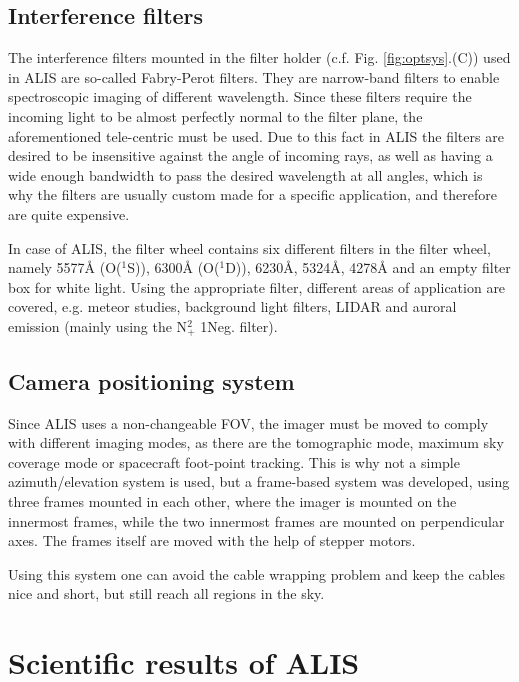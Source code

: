 \subsection{Interference filters}
The interference filters mounted in the filter holder (c.f. Fig. \ref{fig:optsys}.(C)) used in ALIS are so-called Fabry-Perot filters. They are narrow-band filters to enable spectroscopic imaging of different wavelength. Since these filters require the incoming light to be almost perfectly normal to the filter plane, the aforementioned tele-centric must be used.
Due to this fact in ALIS the filters are desired to be insensitive against the angle of incoming rays, as well as having a wide enough bandwidth to pass the desired wavelength at all angles, which is why the filters are usually custom made for a specific application, and therefore are quite expensive. \par
In case of ALIS, the filter wheel contains six different filters in the filter wheel, namely 5577Å (O($^1$S)), 6300Å (O($^1$D)), 6230Å, 5324Å, 4278Å and an empty filter box for white light. Using the appropriate filter, different areas of application are covered, e.g. meteor studies, background light filters, LIDAR and auroral emission (mainly using the N$^2_+$ 1Neg. filter)\citep{brandstrom2003auroral}.

\subsection{Camera positioning system}
Since ALIS uses a non-changeable FOV, the imager must be moved to comply with different imaging modes, as there are the tomographic mode, maximum sky coverage mode or spacecraft foot-point tracking. This is why not a simple azimuth/elevation system is used, but a frame-based system was developed, using three frames mounted in each other, where the imager is mounted on the innermost frames, while the two innermost frames are mounted on perpendicular axes. The frames itself are moved with the help of stepper motors.

Using this system one can avoid the cable wrapping problem and keep the cables nice and short, but still reach all regions in the sky.



\section{Scientific results of ALIS}


